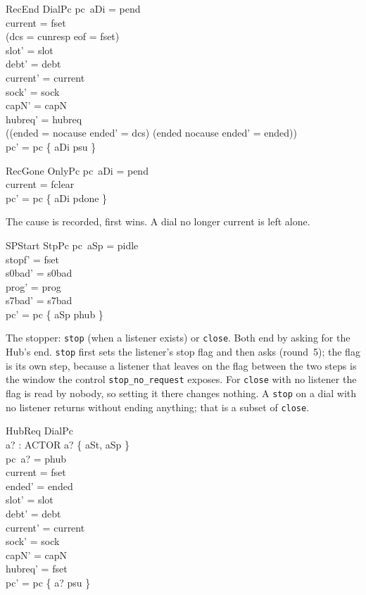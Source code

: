 \documentclass[a4paper,10pt,fleqn]{article}
\begin{document}
\begin{schema}{RecEnd}
  DialPc
\where
  pc~aDi = pend \\
  current = fset \\
  (dcs = cunresp \lor eof = fset) \\
  slot' = slot \\
  debt' = debt \\
  current' = current \\
  sock' = sock \\
  capN' = capN \\
  hubreq' = hubreq \\
  ((ended = nocause \land ended' = dcs) \lor (ended \neq nocause \land ended' = ended)) \\
  pc' = pc \oplus \{ aDi \mapsto psu \}
\end{schema}

\begin{schema}{RecGone}
  OnlyPc
\where
  pc~aDi = pend \\
  current = fclear \\
  pc' = pc \oplus \{ aDi \mapsto pdone \}
\end{schema}

The cause is recorded, first wins.  A dial no longer current is left alone.

\begin{schema}{SPStart}
  StpPc
\where
  pc~aSp = pidle \\
  stopf' = fset \\
  s0bad' = s0bad \\
  prog' = prog \\
  s7bad' = s7bad \\
  pc' = pc \oplus \{ aSp \mapsto phub \}
\end{schema}

The stopper: \texttt{stop} (when a listener exists) or \texttt{close}.  Both end
by asking for the Hub's end.  \texttt{stop} first sets the listener's stop flag
and then asks (round~5); the flag is its own step, because a listener that
leaves on the flag between the two steps is the window the control
\texttt{stop\_no\_request} exposes.  For \texttt{close} with no listener the flag
is read by nobody, so setting it there changes nothing.  A \texttt{stop} on a dial with no listener
returns without ending anything; that is a subset of \texttt{close}.

\begin{schema}{HubReq}
  DialPc \\
  a? : ACTOR
\where
  a? \in \{ aSt, aSp \} \\
  pc~a? = phub \\
  current = fset \\
  ended' = ended \\
  slot' = slot \\
  debt' = debt \\
  current' = current \\
  sock' = sock \\
  capN' = capN \\
  hubreq' = fset \\
  pc' = pc \oplus \{ a? \mapsto psu \}
\end{schema}
\end{document}
